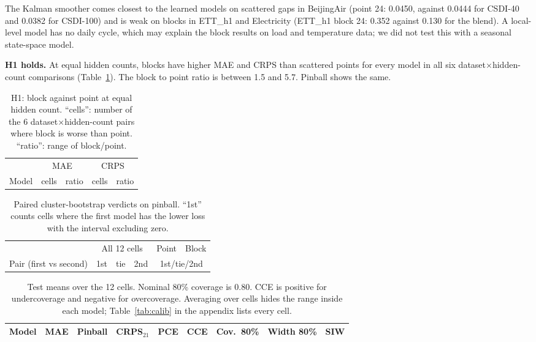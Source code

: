 \documentclass[10pt,twocolumn]{article}
\begin{document}
The Kalman smoother comes closest to the learned models on scattered gaps in BeijingAir (point 24: 0.0450, against 0.0444 for CSDI-40 and 0.0382 for CSDI-100) and is weak on blocks in ETT\_h1 and Electricity (ETT\_h1 block 24: 0.352 against 0.130 for the blend). A local-level model has no daily cycle, which may explain the block results on load and temperature data; we did not test this with a seasonal state-space model.

\textbf{H1 holds.} At equal hidden counts, blocks have higher MAE and CRPS than scattered points for every model in all six dataset$\times$hidden-count comparisons (Table~\ref{tab:h1}). The block to point ratio is between 1.5 and 5.7. Pinball shows the same.

\begin{table}[t]
\centering\small
\setlength{\tabcolsep}{3.5pt}
\begin{tabular}{@{}lcccc@{}}
\toprule
 & \multicolumn{2}{c}{MAE} & \multicolumn{2}{c}{CRPS}\\
\cmidrule(lr){2-3}\cmidrule(l){4-5}
Model & cells & ratio & cells & ratio\\
\midrule

\end{tabular}
\caption{H1: block against point at equal hidden count. ``cells'': number of the 6 dataset$\times$hidden-count pairs where block is worse than point. ``ratio'': range of block/point.}
\label{tab:h1}
\end{table}

\begin{table}[t]
\centering\small
\setlength{\tabcolsep}{3pt}
\begin{tabular}{@{}lccc cc@{}}
\toprule
 & \multicolumn{3}{c}{All 12 cells} & Point & Block\\
Pair (first vs second) & 1st & tie & 2nd & \multicolumn{2}{c}{1st/tie/2nd}\\
\midrule

\end{tabular}
\caption{Paired cluster-bootstrap verdicts on pinball. ``1st'' counts cells where the first model has the lower loss with the interval excluding zero.}
\label{tab:pairs}
\end{table}

\begin{table}[t]
\centering\small
\setlength{\tabcolsep}{6pt}
\begin{tabular}{@{}lcccccccc@{}}
\toprule
Model & MAE & Pinball & CRPS$_{21}$ & PCE & CCE & Cov.\ 80\% & Width 80\% & SIW\\
\midrule

\end{tabular}
\caption{Test means over the 12 cells. Nominal 80\% coverage is 0.80. CCE is positive for undercoverage and negative for overcoverage. Averaging over cells hides the range inside each model; Table~\ref{tab:calib} in the appendix lists every cell.}
\label{tab:summary}
\end{table}
\end{document}
